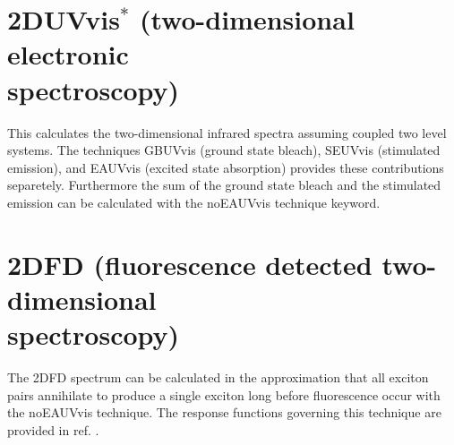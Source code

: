\section{2DUVvis$^{*}$ (two-dimensional electronic\\ spectroscopy)}
This calculates the two-dimensional infrared spectra assuming coupled two level systems. The techniques GBUVvis (ground state bleach), SEUVvis (stimulated emission), and EAUVvis (excited state absorption) provides these contributions separetely. Furthermore the sum of the ground state bleach and the stimulated emission can be calculated with the noEAUVvis technique keyword. 
\section{2DFD (fluorescence detected two-dimensional\\ spectroscopy)}
 The 2DFD spectrum can be calculated in the approximation that all exciton pairs annihilate to produce a single exciton long before fluorescence occur with the noEAUVvis technique. The response functions governing this technique are provided in ref. \cite{Kunsel_2018}.

